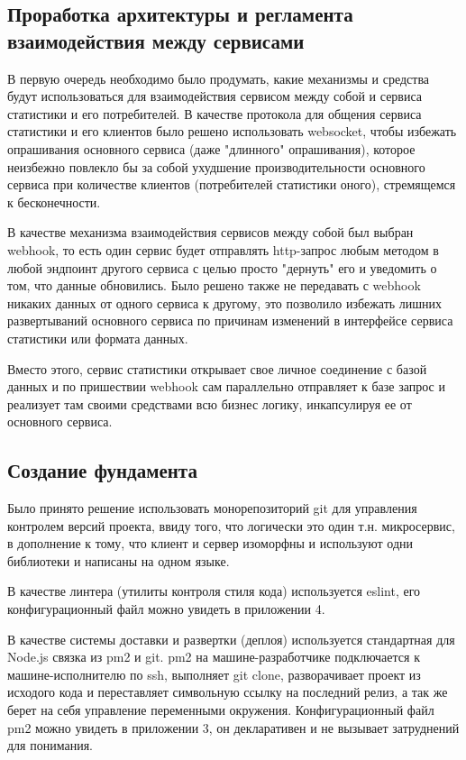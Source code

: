 \documentclass[a4paper, 12pt]{article}
\begin{document}
    \subsection*{Проработка архитектуры и регламента взаимодействия между сервисами}
    В первую очередь необходимо было продумать, какие механизмы и средства будут использоваться для взаимодействия
    сервисом между собой и сервиса статистики и его потребителей. В качестве протокола для общения сервиса статистики и его клиентов
    было решено использовать websocket, чтобы избежать опрашивания основного
    сервиса (даже "длинного" опрашивания), которое неизбежно повлекло бы за собой ухудшение производительности основного сервиса
    при количестве клиентов (потребителей статистики оного), стремящемся к бесконечности.

    В качестве механизма взаимодействия сервисов между собой был выбран webhook, то есть один сервис будет
    отправлять http-запрос любым методом в любой эндпоинт другого сервиса с целью просто "дернуть" его и уведомить
    о том, что данные обновились. Было решено также не передавать с webhook никаких данных от одного сервиса к другому,
    это позволило избежать лишних развертываний основного сервиса по причинам изменений в интерфейсе сервиса статистики или формата данных.

    Вместо этого, сервис статистики открывает свое личное соединение с базой данных и по пришествии webhook сам
    параллельно отправляет к базе запрос и реализует там своими средствами всю бизнес логику, инкапсулируя ее от основного сервиса.

    \subsection*{Создание фундамента}
    Было принято решение использовать монорепозиторий git для управления контролем версий проекта, ввиду того, что
    логически это один т.н. микросервис, в дополнение к тому, что клиент и сервер изоморфны и используют одни библиотеки
    и написаны на одном языке.

    В качестве линтера (утилиты контроля стиля кода) используется eslint, его конфигурационный файл можно увидеть в
    приложении 4.

    В качестве системы доставки и развертки (деплоя) используется стандартная для Node.js связка из pm2 и git. pm2 на машине-разработчике
    подключается к машине-исполнителю по ssh, выполняет git clone, разворачивает проект из исходого кода и переставляет символьную ссылку
    на последний релиз, а так же берет на себя управление переменными окружения. Конфигурационный файл pm2 можно увидеть
    в приложении 3, он декларативен и не вызывает затруднений для понимания.
\end{document}
